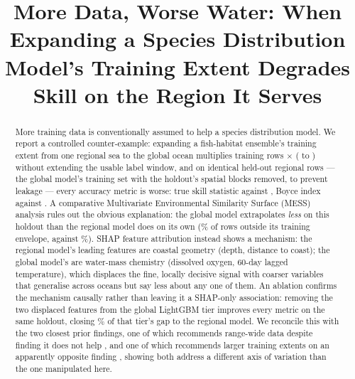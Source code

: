 \documentclass[conference]{IEEEtran}
\providecommand{\citep}[1]{\cite{#1}}
\begin{document}
\title{More Data, Worse Water: When Expanding a Species Distribution Model's
Training Extent Degrades Skill on the Region It Serves}

\author{
}

\maketitle

\begin{abstract}
More training data is conventionally assumed to help a species distribution
model. We report a controlled counter-example: expanding a fish-habitat
ensemble's training extent from one regional sea to the global ocean
multiplies training rows \DataMultiple{}$\times$ (\NRegionalTrain{} to
\NGlobalTrain{}) without extending the usable label window, and on
\NHoldout{} identical held-out regional rows --- the global model's training
set with the holdout's spatial blocks removed, to prevent leakage --- every
accuracy metric is worse: true skill statistic \TSSGlobal{} against
\TSSRegion{}, Boyce index \BoyceGlobal{} against \BoyceRegion{}. A comparative
Multivariate Environmental Similarity Surface (MESS) analysis rules out the
obvious explanation: the global model extrapolates \emph{less} on this
holdout than the regional model does on its own (\MESSFracGlobal{}\% of rows
outside its training envelope, against \MESSFracRegion{}\%). SHAP feature
attribution instead shows a mechanism: the regional model's leading features
are coastal geometry (depth, distance to coast); the global model's are
water-mass chemistry (dissolved oxygen, 60-day lagged temperature), which
displaces the fine, locally decisive signal with coarser variables that
generalise across oceans but say less about any one of them. An ablation confirms the mechanism causally rather than leaving it a SHAP-only association: removing the two displaced features from the global LightGBM tier improves every metric on the same holdout, closing \AblGapClosedPct{}\% of that tier's gap to the regional model. We reconcile
this with the two closest prior findings, one of which recommends
range-wide data despite finding it does not help \citep{elgabbas2018}, and
one of which recommends larger training extents on an apparently opposite
finding \citep{hanberry2026}, showing both address a different axis of
variation than the one manipulated here.
\end{abstract}
\end{document}
